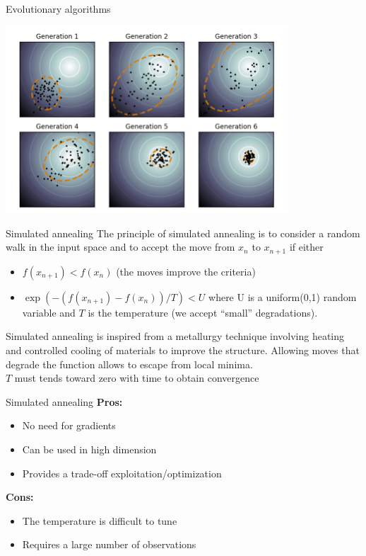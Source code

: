 \documentclass{beamer}
\begin{document}
\begin{frame}{Evolutionary algorithms}
\begin{example}
\begin{center}
\includegraphics[height=7cm]{figures/CMAES}
\end{center}	
\end{example}
\end{frame}

\begin{frame}{Simulated annealing}
The principle of simulated annealing is to consider a random walk in the input space and to accept the move from $x_n$ to $x_{n+1}$ if either
\begin{itemize}
	\item $f(x_{n+1}) < f(x_{n})$ (the moves improve the criteria)
	\item $\exp(-(f(x_{n+1})-f(x_{n}))/T) < U$ where U is a uniform(0,1) random variable and $T$ is the temperature (we accept ``small'' degradations).
\end{itemize}
\vspace{3mm}
Simulated annealing is inspired from a metallurgy technique involving heating and controlled cooling of materials to improve the structure.
\vspace{3mm}
Allowing moves that degrade the function allows to escape from local minima.\\
\vspace{3mm}
$T$ must tends toward zero with time to obtain convergence
\end{frame}

\begin{frame}{Simulated annealing}
\textbf{Pros:}
\begin{itemize}
	\item No need for gradients
	\item Can be used in high dimension
	\item Provides a trade-off exploitation/optimization
\end{itemize}
\vspace{3mm}
\textbf{Cons:}
\begin{itemize}
	\item The temperature is difficult to tune
	\item Requires a large number of observations
\end{itemize}
\end{frame}
\end{document}
